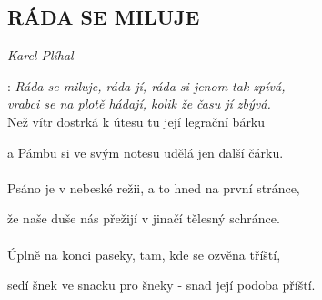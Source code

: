 \begin{flushleft}
	\section*{\Huge RÁDA SE MILUJE}
	\emph{Karel Plíhal}
\end{flushleft}

\textregistered: \emph{Ráda se miluje, ráda jí,
ráda si jenom tak zpívá,\\
vrabci se na plotě hádají,
kolik že času jí zbývá.}\\

Než vítr dostrká k útesu
tu její legrační bárku

a Pámbu si ve svým notesu udělá jen další čárku.\\

\textregistered\\

Psáno je v nebeské režii, a to hned na první stránce,

že naše duše nás přežijí v jinačí tělesný schránce.\\

\textregistered\\

Úplně na konci paseky, tam, kde se ozvěna tříští,

sedí šnek ve snacku pro šneky - snad její podoba příští.\\

\textregistered

\newpage
